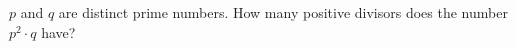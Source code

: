 $p$ and $q$ are distinct prime numbers. How many positive divisors does the number $p^{2} \cdot q$ have?
